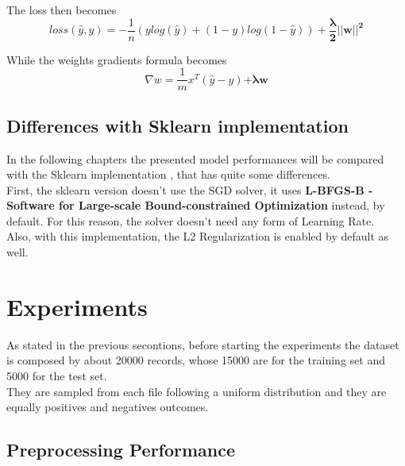 \documentclass[
	letterpaper, %
	10pt, %
]{class}
\begin{document}
The loss then becomes
$$ loss(\hat{y}, y) = -\frac{1}{n}(y log(\hat{y}) + (1-y)log(1-\hat{y})) + \boldsymbol{\frac{\lambda}{2}||w||^2} $$

While the weights gradients formula becomes
$$ \nabla w = \frac{1}{m}x^T(\hat{y} - y) \boldsymbol{+ \lambda w} $$

\subsection{Differences with Sklearn implementation}

In the following chapters the presented model performances will be compared with the Sklearn implementation \cite{logisticsklearn}, that has quite some differences.\\
First, the sklearn version doesn't use the SGD solver, it uses \textbf{L-BFGS-B - Software for Large-scale Bound-constrained Optimization} \cite{lbfgsb} instead, by default.
For this reason, the solver doesn't need any form of Learning Rate.\\
Also, with this implementation, the L2 Regularization is enabled by default as well.



\section{Experiments}

As stated in the previous secontions, before starting the experiments the dataset is composed by about 20000 records, whose 15000 are for the training set and 5000 for the test set.\\
They are sampled from each file following a uniform distribution and they are equally positives and negatives outcomes.

\subsection{Preprocessing Performance}
\end{document}
